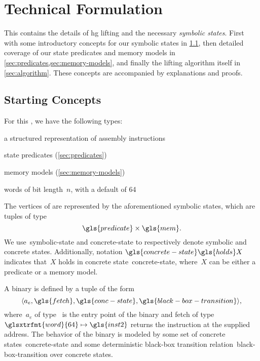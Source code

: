 \chapter{Technical Formulation}\label{ch:hg-formulation}
This  contains the details of \ac{hg} lifting and the necessary \emph{symbolic states}.
First with some introductory concepts for our symbolic states in \cref{hg-concepts},
then detailed coverage of our state predicates and memory models in \cref{sec:predicates,sec:memory-models},
and finally the lifting algorithm itself in \cref{sec:algorithm}.
These concepts are accompanied by explanations and proofs.

\section{Starting Concepts}\label{hg-concepts}
For this , we have the following types:
\begin{description}[leftmargin=!,labelwidth=\widthof{\bfseries \glsentryname{mem}}]
  \item[\gls{inst2}] a structured representation of assembly instructions
  \item[\gls{predicate}] state predicates (\cref{sec:predicates})
  \item[\gls{mem}] memory models (\cref{sec:memory-models})
  \item[\glsxtrfmt{word}n] words of bit length~$n$, with a default of \SI{64}\bit
\end{description}
The vertices of  are represented by the aforementioned symbolic states, which are tuples of type
\begin{equation*}
  \gls{predicate}\times\gls{mem}.
\end{equation*}
We use~\gls{symbolic-state} and \gls{concrete-state} to respectively denote symbolic and concrete states.
Additionally, notation $\gls{concrete-state}\gls{holds}X$ indicates that~$X$ holds in concrete state~\gls{concrete-state},
where~$X$ can be either a predicate or a memory model.
\begin{definition}[Binaries]
  A binary is defined by a tuple of the form
  \begin{equation*}
    \langle a_e,\gls{fetch},\gls{conc-state},\gls{black-box-transition}\rangle,
  \end{equation*}
  where~$a_e$ of type~ is the entry point of the binary and \gls{fetch} of type $\glsxtrfmt{word}{64}\mapsto\gls{inst2}$ returns the instruction at the supplied address.
  The behavior of the binary is modeled by some set of concrete states~\gls{concrete-state} and some deterministic black-box transition relation~\gls{black-box-transition} over concrete states.
\end{definition}
